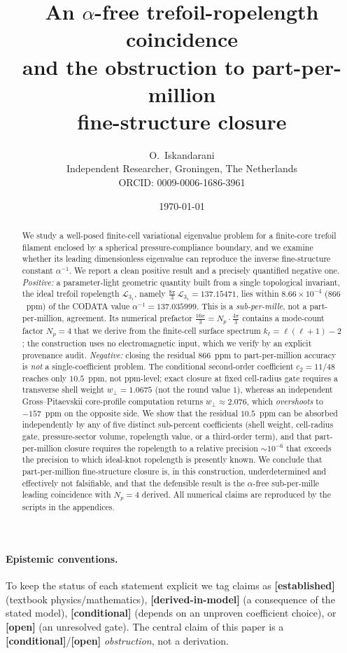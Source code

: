 \documentclass[11pt,a4paper]{article}
\title{An $\alpha$-free trefoil-ropelength coincidence\\
and the obstruction to part-per-million\\
fine-structure closure}
\author{%
  O.~Iskandarani\\
  \small Independent Researcher, Groningen, The Netherlands\\
  \small ORCID: 0009-0006-1686-3961
}
\date{\today}
\theoremstyle{definition}
\newcommand{\established}{\textbf{[established]}}
\newcommand{\derivedmodel}{\textbf{[derived-in-model]}}
\newcommand{\conditional}{\textbf{[conditional]}}
\newcommand{\open}{\textbf{[open]}}
\begin{document}
\maketitle

\begin{abstract}
We study a well-posed finite-cell variational eigenvalue problem for a
finite-core trefoil filament enclosed by a spherical pressure-compliance
boundary, and we examine whether its leading dimensionless eigenvalue can
reproduce the inverse fine-structure constant $\alpha^{-1}$. We report a clean
positive result and a precisely quantified negative one. \emph{Positive:} a
parameter-light geometric quantity built from a single topological invariant, the
ideal trefoil ropelength $\mathcal{L}_{3_1}$, namely
$\tfrac{8\pi}{3}\,\mathcal{L}_{3_1}=137.15471$, lies within
$8.66\times10^{-4}$ ($866$~ppm) of the CODATA value $\alpha^{-1}=137.035999$.
This is a \emph{sub-per-mille}, not a part-per-million, agreement. Its numerical
prefactor $\tfrac{16\pi}{3}=N_p\cdot\tfrac{4\pi}{3}$ contains a mode-count factor
$N_p=4$ that we derive from the finite-cell surface spectrum
$k_\ell=\ell(\ell+1)-2$; the construction uses no electromagnetic input, which we
verify by an explicit provenance audit. \emph{Negative:} closing the residual
$866$~ppm to part-per-million accuracy is \emph{not} a single-coefficient problem.
The conditional second-order coefficient $c_2=11/48$ reaches only $10.5$~ppm, not
ppm-level; exact closure at fixed cell-radius gate requires a transverse shell
weight $w_\perp=1.0675$ (not the round value $1$), whereas an independent
Gross--Pitaevskii core-profile computation returns $w_\perp\approx2.076$, which
\emph{overshoots} to $-157$~ppm on the opposite side. We show that the residual
$10.5$~ppm can be absorbed independently by any of five distinct sub-percent
coefficients (shell weight, cell-radius gate, pressure-sector volume, ropelength
value, or a third-order term), and that part-per-million closure requires the
ropelength to a relative precision $\sim10^{-6}$ that exceeds the precision to
which ideal-knot ropelength is presently known. We conclude that part-per-million
fine-structure closure is, in this construction, underdetermined and effectively
not falsifiable, and that the defensible result is the $\alpha$-free
sub-per-mille leading coincidence with $N_p=4$ derived. All numerical claims are
reproduced by the scripts in the appendices.
\end{abstract}

\paragraph{Epistemic conventions.}
To keep the status of each statement explicit we tag claims as \established{}
(textbook physics/mathematics), \derivedmodel{} (a consequence of the stated
model), \conditional{} (depends on an unproven coefficient choice), or \open{}
(an unresolved gate). The central claim of this paper is a \conditional{}/\open{}
\emph{obstruction}, not a derivation.
\end{document}
